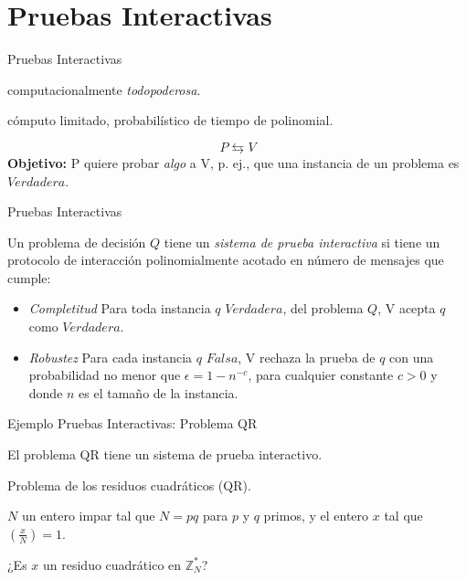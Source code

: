 \documentclass{beamer}
\begin{document}
\section{Pruebas Interactivas}

\begin{frame}{Pruebas Interactivas}
	
	\begin{description}[Verificador (V)]
		\item[Probador (P)] computacionalmente \textit{todopoderosa}.
		\item[Verificador (V)] cómputo limitado, probabilístico de tiempo de polinomial.	
	\end{description}
	{\Large\[P \leftrightarrows  V\]}
	\textbf{Objetivo:} P quiere probar \textit{algo} a V, p. ej., que una instancia de un problema es $Verdadera$.

\end{frame}

\begin{frame}{Pruebas Interactivas}
	\begin{definition}
		
		Un problema de decisión $Q$ tiene un \textit{sistema de prueba interactiva} si tiene un protocolo de interacción polinomialmente acotado en número de mensajes que cumple:
		
		\begin{itemize}
			\item \textit{Completitud} Para toda instancia $q$ $Verdadera$, del problema $Q$, V acepta $q$ como $Verdadera$.
			\item \textit{Robustez} Para cada instancia $q$ $Falsa$, V rechaza la prueba de $q$ con una probabilidad no menor que $\epsilon = 1-n^{-c}$, para cualquier constante $c>0$ y donde $n$ es el tamaño de la instancia.
		\end{itemize}
		
	\end{definition}
\end{frame}

\begin{frame}{Ejemplo Pruebas Interactivas: Problema QR}
	\begin{theorem}
		El problema QR tiene un sistema de prueba interactivo.
	\end{theorem}

	\begin{description}[Parámetros]
		\item[Nombre] Problema de los residuos cuadr\'aticos (QR).
		\item[Parámetros] $N$ un entero impar tal que $N = pq$ para $p$ y $q$ primos, y el entero $x$ tal que $\left( \frac{x}{N} \right) = 1$.
		\item[Pregunta] ¿Es $x$ un residuo cuadrático en ${\mathbb Z}_N^*$?
	\end{description}
\end{frame}
\end{document}
